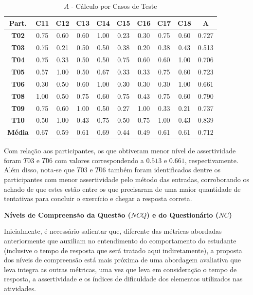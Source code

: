 \begin{table}[htbp]
	\centering
	\caption{$A$ - Cálculo por Casos de Teste}
	\begin{tabular}{|c|c|c|c|c|c|c|c|c|c|}
		\hline
		\rowcolor[HTML]{D9D9D9} 
		\cellcolor[HTML]{D0CECE}\textbf{Part.} & \textbf{C11} & \textbf{C12} & \textbf{C13} & \textbf{C14} & \textbf{C15} & \textbf{C16} & \textbf{C17} & \textbf{C18} & \cellcolor[HTML]{D0CECE}\textbf{A} \\ \hline
		\textbf{T02} & 0.75 & 0.60 & 0.60 & 1.00 & 0.23 & 0.30 & 0.75 & 0.60 & 0.727 \\ \hline
		\rowcolor[HTML]{F2F2F2} 
		\textbf{T03} & 0.75 & 0.21 & 0.50 & 0.50 & 0.38 & 0.20 & 0.38 & 0.43 & 0.513 \\ \hline
		\textbf{T04} & 0.75 & 0.33 & 0.50 & 0.50 & 0.75 & 0.60 & 0.60 & 1.00 & 0.706 \\ \hline
		\rowcolor[HTML]{F2F2F2} 
		\textbf{T05} & 0.57 & 1.00 & 0.50 & 0.67 & 0.33 & 0.33 & 0.75 & 0.60 & 0.723 \\ \hline
		\textbf{T06} & 0.30 & 0.50 & 0.60 & 1.00 & 0.30 & 0.30 & 0.30 & 1.00 & 0.661 \\ \hline
		\rowcolor[HTML]{F2F2F2} 
		\textbf{T08} & 1.00 & 0.50 & 0.75 & 0.60 & 0.75 & 0.43 & 0.75 & 0.60 & 0.790 \\ \hline
		\textbf{T09} & 0.75 & 0.60 & 1.00 & 0.50 & 0.27 & 1.00 & 0.33 & 0.21 & 0.737 \\ \hline
		\rowcolor[HTML]{F2F2F2} 
		\textbf{T10} & 0.50 & 1.00 & 0.43 & 0.75 & 0.50 & 0.75 & 1.00 & 0.43 & 0.839 \\ \hline
		\textbf{Média} & 0.67 & 0.59 & 0.61 & 0.69 & 0.44 & 0.49 & 0.61 & 0.61 & 0.712 \\ \hline
	\end{tabular}
	\label{tab:F3_A2_A_CASOS2}
\end{table}

Com relação aos participantes, os que obtiveram menor nível de assertividade foram $T03$ e $T06$ com valores correspondendo a $0.513$ e $0.661$, respectivamente. Além disso, nota-se que $T03$ e $T06$ também foram identificados dentre os participantes com menor assertividade pelo método das entradas, corroborando os achado de que estes estão entre os que precisaram de uma maior quantidade de tentativas para concluir o exercício e chegar a resposta correta.

\textbf{Níveis de Compreensão da Questão ($NCQ$) e do Questionário ($NC$)}

Inicialmente, é necessário salientar que, diferente das métricas abordadas anteriormente que auxiliam no entendimento do comportamento do estudante (inclusive o tempo de resposta que será tratado aqui indiretamente), a proposta dos níveis de compreensão está mais próxima de uma abordagem avaliativa que leva integra as outras métricas, uma vez que leva em consideração o tempo de resposta, a assertividade e os índices de dificuldade dos elementos utilizados nas atividades.

